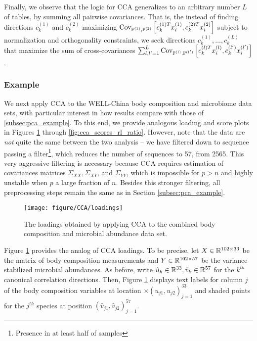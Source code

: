 \documentclass{article}
\begin{document}
Finally, we observe that the logic for CCA generalizes to an arbitrary number
$L$ of tables, by summing all pairwise covariances. That is, the instead of
finding directions $c_{k}^{(1)}$ and $c_{k}^{(2)}$ maximizing
$\mathrm{Cov}_{\mathbb{P}^{(1)}, \mathbb{P}^{(2)}}\left[{c_{k}^{(1)T}x_{i}^{(1)},
  c_{k}^{(2)T}x_{i}^{(2)}}\right]$ subject to normalization and orthogonality
constraints, we seek directions $c_{k}^{(1)}, \dots, c_{k}^{(L)}$ that maximize
the sum of cross-covariances $\sum_{l,l^{\prime} = 1}^{L} \mathrm{Cov}_{\mathbb{P}^{(l)},
  \mathbb{P}^{(l^{\prime})}}\left[{c_{k}^{(l) T}x_{i}^{(l)},
  c_{k}^{(l^{\prime})}x_{i}^{(l^{\prime})}}\right]$.

\subsubsection{Example}
\label{subsec:cca_example}

We next apply CCA to the WELL-China body composition and microbiome data sets,
with particular interest in how results compare with those of
\ref{subsec:pca_example}. To this end, we provide analogous loading and score
plots in Figures \ref{fig:cca_loadings} through \ref{fig:cca_scores_rl_ratio}.
However, note that the data are \textit{not} quite the same between the two
analysis -- we have filtered down to sequence passing a filter\footnote{Presence
  in at least half of samples}, which reduces the number of sequences to 57,
from 2565. This very aggressive filtering is necessary because CCA requires
estimation of covariances matrices $\Sigma_{XX}, \Sigma_{XY}$, and
$\Sigma_{YY}$, which is impossible for $p > n$ and highly unstable when $p$ a
large fraction of $n$. Besides this stronger filtering, all preprocessing steps
remain the same as in Section \ref{subsec:pca_example}.

\begin{figure}[ht]
  \centering
  \texttt{[image: figure/CCA/loadings]}
  \caption{The loadings obtained by applying CCA to the combined body
    composition and microbial abundance data set. \label{fig:cca_loadings} }
\end{figure}

Figure \ref{fig:cca_loadings} provides the analog of CCA loadings. To be
precise, let $X \in \mathbb{R}^{102\times 33}$ be the matrix of body composition
measurements and $Y \in \mathbb{R}^{102 \times 57}$ be the variance stabilized
microbial abundances. As before, write $\hat{u}_{k} \in \mathbb{R}^{33}, \hat{v}_{k}
\in \mathbb{R}^{57}$ for the $k^{th}$ canonical correlation directions. Then, Figure
\ref{fig:cca_loadings} displays text labels for column $j$ of the body
composition variables at location $\times \left(u_{j1}, u_{j2}\right)_{j =
  1}^{33}$ and shaded points for the $j^{th}$ species at position
$\left(\hat{v}_{j1}, \hat{v}_{j2}\right)_{j = 1}^{57}$.
\end{document}
